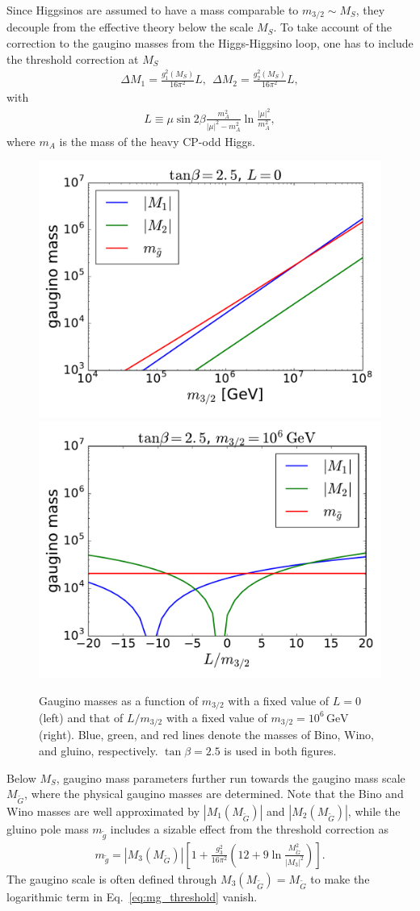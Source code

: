 \documentclass[12pt,twoside,book]{article}
\begin{document}
Since Higgsinos are assumed to have a mass comparable to $m_{3/2} \sim M_S$, they decouple from the effective theory below the scale $M_S$.
To take account of the correction to the gaugino masses from the Higgs-Higgsino loop, one has to include the threshold correction at $M_S$
\begin{align}
  \Delta M_1 = \frac{g_1^2 (M_S)}{16\pi^2} L,
  ~~
  \Delta M_2 = \frac{g_2^2 (M_S)}{16\pi^2} L,
\end{align}
with
\begin{align}
  L \equiv \mu \sin 2\beta \frac{m_A^2}{|\mu|^2 - m_A^2} \ln \frac{|\mu|^2}{m_A^2},
\end{align}
where $m_A$ is the mass of the heavy CP-odd Higgs.

\begin{figure}
  \centering
  \includegraphics[width=0.48\hsize]{amsb_m32.pdf}
  \includegraphics[width=0.48\hsize]{amsb_L.pdf}
  \caption{
    Gaugino masses as a function of $m_{3/2}$ with a fixed value of $L = 0$ (left) and that of $L / m_{3/2}$ with a fixed value of $m_{3/2} = 10^6\,\mathrm{GeV}$ (right).
    Blue, green, and red lines denote the masses of Bino, Wino, and gluino, respectively.
    $\tan\beta = 2.5$ is used in both figures.
  }
  \label{fig:amsb_spectrum}
\end{figure}

Below $M_S$, gaugino mass parameters further run towards the gaugino mass scale $M_{\tilde{G}}$, where the physical gaugino masses are determined.
Note that the Bino and Wino masses are well approximated by $|M_1 (M_{\tilde{G}})|$ and $|M_2 (M_{\tilde{G}})|$, while the gluino pole mass $m_{\tilde{g}}$ includes a sizable effect from the threshold correction as \cite{Giudice:2004tc}
\begin{align}
  m_{\tilde{g}} = \left| M_3 (M_{\tilde{G}}) \right| \left[
  1 + \frac{g_3^2}{16\pi^2} \left( 12 + 9\ln \frac{M_{\tilde{G}}^2}{|M_3|^2} \right)
  \right].
  \label{eq:mg_threshold}
\end{align}
The gaugino scale is often defined through $M_3 (M_{\tilde{G}}) = M_{\tilde{G}}$ to make the logarithmic term in Eq.~\eqref{eq:mg_threshold} vanish.
\end{document}
